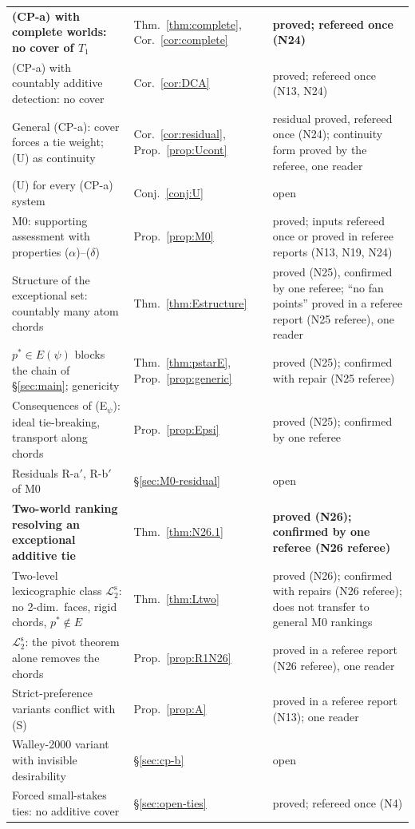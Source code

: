 \documentclass[11pt]{article}
\theoremstyle{definition}
\theoremstyle{remark}
\newcommand{\Ltwo}{\mathcal L_2^{\mathrm s}}
\begin{document}
{\begin{longtable}{>{\raggedright\arraybackslash}p{6.4cm}>{\raggedright\arraybackslash}p{2.1cm}>{\raggedright\arraybackslash}p{5.6cm}}
\textbf{(CP-a) with complete worlds: no cover of $T_1$} & Thm.~\ref{thm:complete}, Cor.~\ref{cor:complete} & \textbf{proved; refereed once (N24)}\\
(CP-a) with countably additive detection: no cover & Cor.~\ref{cor:DCA} & proved; refereed once (N13, N24)\\
General (CP-a): cover forces a tie weight; (U) as continuity & Cor.~\ref{cor:residual}, Prop.~\ref{prop:Ucont} & residual proved, refereed once (N24); continuity form proved by the referee, one reader\\
(U) for every (CP-a) system & Conj.~\ref{conj:U} & open\\
M0: supporting assessment with properties ($\alpha$)--($\delta$) & Prop.~\ref{prop:M0} & proved; inputs refereed once or proved in referee reports (N13, N19, N24)\\
Structure of the exceptional set: countably many atom chords & Thm.~\ref{thm:Estructure} & proved (N25), confirmed by one referee; ``no fan points'' proved in a referee report (N25 referee), one reader\\
$p^*\in E(\psi)$ blocks the chain of \S\ref{sec:main}; genericity & Thm.~\ref{thm:pstarE}, Prop.~\ref{prop:generic} & proved (N25); confirmed with repair (N25 referee)\\
Consequences of (E$_\psi$): ideal tie-breaking, transport along chords & Prop.~\ref{prop:Epsi} & proved (N25); confirmed by one referee\\
Residuals R-a$'$, R-b$'$ of M0 & \S\ref{sec:M0-residual} & open\\
\textbf{Two-world ranking resolving an exceptional additive tie} & Thm.~\ref{thm:N26.1} & \textbf{proved (N26); confirmed by one referee (N26 referee)}\\
Two-level lexicographic class $\Ltwo$: no 2-dim.\ faces, rigid chords, $p^*\notin E$ & Thm.~\ref{thm:Ltwo} & proved (N26); confirmed with repairs (N26 referee); does not transfer to general M0 rankings\\
$\Ltwo$: the pivot theorem alone removes the chords & Prop.~\ref{prop:R1N26} & proved in a referee report (N26 referee), one reader\\
Strict-preference variants conflict with (S) & Prop.~\ref{prop:A} & proved in a referee report (N13); one reader\\
Walley-2000 variant with invisible desirability & \S\ref{sec:cp-b} & open\\
Forced small-stakes ties: no additive cover & \S\ref{sec:open-ties} & proved; refereed once (N4)\\

\end{longtable}}
\end{document}
